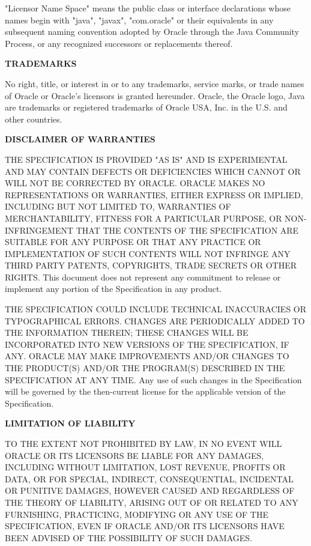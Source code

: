 \begin{flushleft}
"Licensor Name Space" means the public class or interface declarations whose names begin with "java", "javax", "com.oracle" or their equivalents in any subsequent naming convention adopted by Oracle through the Java Community Process, or any recognized successors or replacements thereof.

{\bfseries TRADEMARKS}

No right, title, or interest in or to any trademarks, service marks, or trade names of Oracle or Oracle's licensors is granted hereunder. Oracle, the Oracle logo, Java are trademarks or registered trademarks of Oracle USA, Inc. in the U.S. and other countries.

{\bfseries DISCLAIMER OF WARRANTIES}

THE SPECIFICATION IS PROVIDED "AS IS" AND IS EXPERIMENTAL AND MAY CONTAIN DEFECTS OR DEFICIENCIES WHICH CANNOT OR WILL NOT BE CORRECTED BY ORACLE. ORACLE MAKES NO REPRESENTATIONS OR WARRANTIES, EITHER EXPRESS OR IMPLIED, INCLUDING BUT NOT LIMITED TO, WARRANTIES OF MERCHANTABILITY, FITNESS FOR A PARTICULAR PURPOSE, OR NON-INFRINGEMENT THAT THE CONTENTS OF THE SPECIFICATION ARE SUITABLE FOR ANY PURPOSE OR THAT ANY PRACTICE OR IMPLEMENTATION OF SUCH CONTENTS WILL NOT INFRINGE ANY THIRD PARTY PATENTS, COPYRIGHTS, TRADE SECRETS OR OTHER RIGHTS. This document does not represent any commitment to release or implement any portion of the Specification in any product.

THE SPECIFICATION COULD INCLUDE TECHNICAL INACCURACIES OR TYPOGRAPHICAL ERRORS. CHANGES ARE PERIODICALLY ADDED TO THE INFORMATION THEREIN; THESE CHANGES WILL BE INCORPORATED INTO NEW VERSIONS OF THE SPECIFICATION, IF ANY. ORACLE MAY MAKE IMPROVEMENTS AND/OR CHANGES TO THE PRODUCT(S) AND/OR THE PROGRAM(S) DESCRIBED IN THE SPECIFICATION AT ANY TIME. Any use of such changes in the Specification will be governed by the then-current license for the applicable version of the Specification.

{\bfseries LIMITATION OF LIABILITY}

TO THE EXTENT NOT PROHIBITED BY LAW, IN NO EVENT WILL ORACLE OR ITS LICENSORS BE LIABLE FOR ANY DAMAGES, INCLUDING WITHOUT LIMITATION, LOST REVENUE, PROFITS OR DATA, OR FOR SPECIAL, INDIRECT, CONSEQUENTIAL, INCIDENTAL OR PUNITIVE DAMAGES, HOWEVER CAUSED AND REGARDLESS OF THE THEORY OF LIABILITY, ARISING OUT OF OR RELATED TO ANY FURNISHING, PRACTICING, MODIFYING OR ANY USE OF THE SPECIFICATION, EVEN IF ORACLE AND/OR ITS LICENSORS HAVE BEEN ADVISED OF THE POSSIBILITY OF SUCH DAMAGES.


\end{flushleft}
